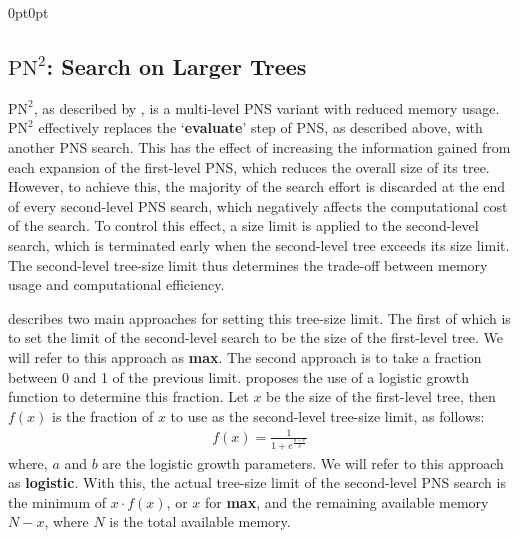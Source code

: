 \begin{adjustwidth}{0pt}{0pt}
\subsection{\texorpdfstring{$\text{PN}^2$}{PN²}: Search on Larger Trees}
\label{subsec:PN2}
${\text{PN}}^2$, as described by , is a multi-level PNS variant with reduced memory usage. ${\text{PN}}^2$ effectively replaces the `\textbf{evaluate}' step of PNS, as described above, with another PNS search. This has the effect of increasing the information gained from each expansion of the first-level PNS, which reduces the overall size of its tree. However, to achieve this, the majority of the search effort is discarded at the end of every second-level PNS search, which negatively affects the computational cost of the search.
To control this effect, a size limit is applied to the second-level search, which is terminated early when the second-level tree exceeds its size limit. The second-level tree-size limit thus determines the trade-off between memory usage and computational efficiency.

 describes two main approaches for setting this tree-size limit. The first of which is to set the limit of the second-level search to be the size of the first-level tree. We will refer to this approach as \textbf{max}. The second approach is to take a fraction between 0 and 1 of the previous limit.  proposes the use of a logistic growth function to determine this fraction.
Let $x$ be the size of the first-level tree, then $f(x)$ is the fraction of $x$ to use as the second-level tree-size limit, as follows:
\begin{gather}
    f(x) = \frac{1}{1+e^{\frac{a-x}{b}}}
\end{gather}
where, $a$ and $b$ are the logistic growth parameters. We will refer to this approach as \textbf{logistic}. With this, the actual tree-size limit of the second-level PNS search is the minimum of $x\cdot f(x)$, or $x$ for \textbf{max}, and the remaining available memory $N-x$, where $N$ is the total available memory.


\end{adjustwidth}
